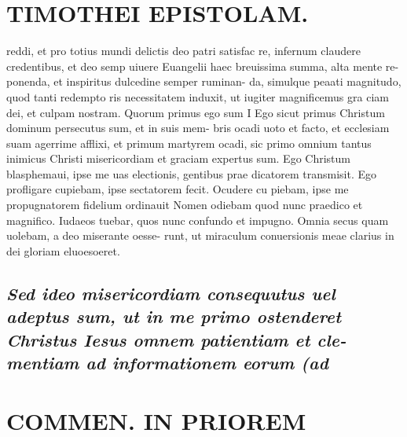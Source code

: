 \documentclass{article}
\begin{document}
\begin{pages}
\section*{TIMOTHEI EPISTOLAM. }
\marginpar{[ p.33 ]}\pstart reddi, et pro totius mundi delictis deo patri satisfac re, infernum claudere credentibus, et deo semp uiuere Euangelii haec breuissima summa, alta mente re- ponenda, et inspiritus dulcedine semper ruminan- da, simulque peaati magnitudo, quod tanti redempto ris necessitatem induxit, ut iugiter magnificemus gra ciam dei, et culpam nostram.  \pend\pstart Quorum primus ego sum I Ego sicut primus Christum dominum persecutus sum, et in suis mem- bris ocadi uoto et facto, et ecclesiam suam agerrime afflixi, et primum martyrem ocadi, sic primo omnium tantus inimicus Christi misericordiam et graciam expertus sum. Ego Christum blasphemaui, ipse me uas electionis, gentibus prae dicatorem transmisit. Ego profligare cupiebam, ipse sectatorem fecit. Ocudere cu piebam, ipse me propugnatorem fidelium ordinauit Nomen odiebam quod nunc praedico et magnifico. Iudaeos tuebar, quos nunc confundo et impugno. Omnia secus quam uolebam, a deo miserante oesse- runt, ut miraculum conuersionis meae clarius in dei gloriam eluoesoeret.  \pend
{}
{}
\subsection*{\textit{Sed ideo misericordiam consequutus uel adeptus sum, ut in me primo ostenderet Christus Iesus omnem patientiam et cle- mentiam ad informationem eorum (ad }}
\section*{COMMEN. IN PRIOREM }
\marginpar{[ p.34 ]}
{}

\end{pages}
\end{document}
